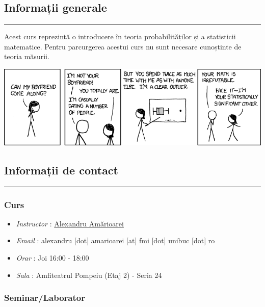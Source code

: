 \documentclass[]{article}
\title{}
\author{}
\date{}
\begin{document}
{
\setcounter{tocdepth}{3}
\tableofcontents
}
\subsection{Informații generale}\label{informatii-generale}

\begin{center}\rule{0.5\linewidth}{\linethickness}\end{center}

Acest curs reprezintă o introducere în teoria probabilităților și a
statisticii matematice. Pentru parcurgerea acestui curs nu sunt necesare
cunoștinte de teoria măsurii.

\begin{center}\includegraphics[width=0.8\linewidth]{images/boyfriend} \end{center}

\subsection{Informații de contact}\label{informatii-de-contact}

\begin{center}\rule{0.5\linewidth}{\linethickness}\end{center}

\subsubsection{Curs}\label{curs}

\begin{itemize}
\item
  \emph{Instructor} : \href{https://alexamarioarei.github.io/}{Alexandru
  Amărioarei}
\item
  \emph{Email} : alexandru {[}dot{]} amarioarei {[}at{]} fmi {[}dot{]}
  unibuc {[}dot{]} ro
\item
  \emph{Orar} : Joi 16:00 - 18:00
\item
  \emph{Sala} : Amfiteatrul Pompeiu (Etaj 2) - Seria 24
\end{itemize}

\subsubsection{Seminar/Laborator}\label{seminarlaborator}
\end{document}
